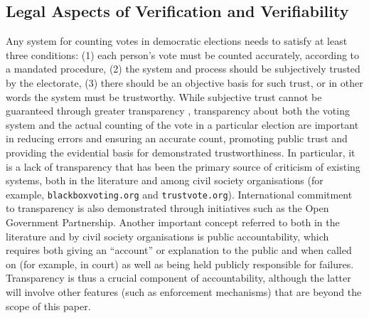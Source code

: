    
   
\subsection{Legal Aspects of Verification and Verifiability}
Any system for counting votes in democratic elections needs to
satisfy at least three conditions: (1) each person's vote must be
counted accurately, according to a mandated procedure, (2) the
system and process should be subjectively trusted by the electorate,
(3) there should be an objective basis for such trust, or in other
words the system must be trustworthy. While subjective trust cannot
be guaranteed through greater transparency \citep{ONeill:2002:QT}, transparency about
both the voting system and the actual counting of the vote in a
particular election are important in reducing errors and ensuring an
accurate count, promoting public trust and providing the evidential
basis for demonstrated trustworthiness. In particular, it is a lack
of transparency that has been the primary source of criticism of
existing systems, both in the literature
\citep{Carrier:2012:VCT,Conway:2017:ANS} and among civil
society organisations \citep{Vogl:2012:WWC} (for example,
\texttt{blackboxvoting.org} and
\texttt{trustvote.org}). International commitment to transparency is also
demonstrated through initiatives such as the Open Government
Partnership. Another important concept referred to both in the
literature and by civil society organisations is public
accountability, which requires both giving an “account” or
explanation to the public and when called on (for example, in court)
as well as being held publicly responsible for failures.
Transparency is thus a crucial component of accountability, although
the latter will involve other features (such as enforcement
mechanisms) that are beyond the scope of this paper. 

